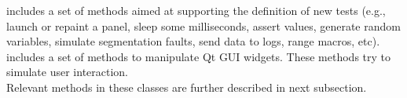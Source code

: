 \vspace{2ex}


 includes a set of methods aimed at supporting the
definition of new tests (e.g., launch or repaint a panel, sleep some
milliseconds, assert values, generate random variables, simulate
segmentation faults, send data to logs, range macros, etc).\\
%
\indent {} includes a set of methods to manipulate Qt GUI
widgets. These methods try to simulate user interaction.\\
%
Relevant methods in these classes are further described in next subsection.



\newpage




